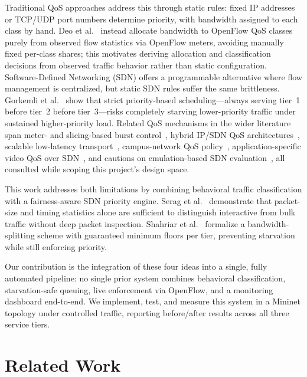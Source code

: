 \documentclass[conference]{IEEEtran}
\begin{document}
Traditional QoS approaches address this through static rules: fixed
IP addresses or TCP/UDP port numbers determine priority, with bandwidth
assigned to each class by hand. Deo et al.~\cite{deo2024} instead
allocate bandwidth to OpenFlow QoS classes purely from observed flow
statistics via OpenFlow meters, avoiding manually fixed per-class
shares; this motivates deriving allocation and classification decisions
from observed traffic behavior rather than static configuration.
Software-Defined Networking (SDN) offers a programmable alternative
where flow management is centralized, but static SDN rules suffer the
same brittleness. Gorkemli et al.~\cite{gorkemli2015} show that strict
priority-based scheduling—always serving tier~1 before tier~2 before
tier~3—risks completely starving lower-priority traffic under sustained
higher-priority load. Related QoS mechanisms in the wider literature
span meter- and slicing-based burst control~\cite{slicing2025}, hybrid
IP/SDN QoS architectures~\cite{hussein2025}, scalable low-latency
transport~\cite{fairhurst2021}, campus-network QoS
policy~\cite{qospolicies2019}, application-specific video QoS over
SDN~\cite{almaqri2016,shvc2022}, and cautions on emulation-based SDN
evaluation~\cite{emulation2022}, all consulted while scoping this
project's design space.

This work addresses both limitations by combining behavioral traffic
classification with a fairness-aware SDN priority engine. Serag et
al.~\cite{serag2025} demonstrate that packet-size and timing statistics
alone are sufficient to distinguish interactive from bulk traffic
without deep packet inspection. Shahriar et al.~\cite{shahriar2024}
formalize a bandwidth-splitting scheme with guaranteed minimum floors
per tier, preventing starvation while still enforcing priority.

Our contribution is the integration of these four ideas into a single,
fully automated pipeline: no single prior system combines behavioral
classification, starvation-safe queuing, live enforcement via
OpenFlow, and a monitoring dashboard end-to-end. We implement, test,
and measure this system in a Mininet topology under controlled
traffic, reporting before/after results across all three service tiers.

\section{Related Work}
\label{sec:related}
\end{document}
